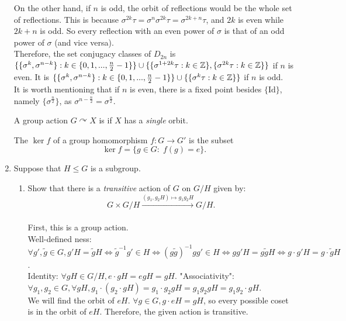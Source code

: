 \documentclass{amsart}
\begin{document}
\begin{enumerate}[itemsep=0.2in]
On the other hand, if $n$ is odd, the orbit of reflections would be the whole set of reflections. This is because $\sigma^{2k}\tau=\sigma^n\sigma^{2k}\tau=\sigma^{2k+n}\tau$, and $2k$ is even while $2k+n$ is odd. So every reflection with an even power of $\sigma$ is that of an odd power of $\sigma$ (and vice versa). \\

Therefore, the set conjugacy classes of $D_{2n}$ is $\{\{\sigma^k,\sigma^{n-k}\}:k\in\{0,1,...,\frac{n}{2}-1\}\}\cup\{\{\sigma^{1+2k}\tau:k\in\mathbb{Z}\},\{\sigma^{2k}\tau:k\in\mathbb{Z}\}\}$ if $n$ is even. 
It is $\{\{\sigma^k,\sigma^{n-k}\}:k\in\{0,1,...,\frac{n}{2}-1\}\}\cup\{\{\sigma^k\tau:k\in\mathbb{Z}\}\}$ if $n$ is odd.\\

It is worth mentioning that if $n$ is even, there is a fixed point besides $\{\mathrm{Id}\}$, namely $\{\sigma^{\frac{n}{2}}\}$, as $\sigma^{n-\frac{n}{2}}=\sigma^{\frac{n}{2}}$.

\vspace{0.2in}
A group action $G\curvearrowright X$ is  if $X$ has a \emph{single} orbit.


\vspace{0.2in}
The  $\ker f$ of a group homomorphism $f:G\to G'$ is the subset
\[
\ker f = \{g\in G:\; f(g) = e\}.
\]


\item Suppose that $H\leq G$ is a subgroup. 
\begin{enumerate}
	\item Show that there is a \emph{transitive} action of $G$ on $G/H$ given by:
\[
G\times G/H \xrightarrow{(g_1,g_2H)\mapsto g_1g_2H}G/H.
\]\\

First, this is a group action.\\

Well-defined ness:  $\forall g',\tilde{g}\in G,g'H=\tilde{g}H\iff\tilde{g}^{-1}g'\in H\iff(g\tilde{g})^{-1}gg'\in H\iff gg'H=g\tilde{g}H\iff g\cdot g'H=g\cdot \tilde{g}H$.\\

Identity: $\forall gH\in G/H,e\cdot gH=egH=gH$.
"Associativity": $\forall g_1,g_2\in G,\forall gH,g_1\cdot (g_2\cdot gH)=g_1\cdot g_2gH=g_1g_2gH=g_1g_2\cdot gH$.\\

We will find the orbit of $eH$. $\forall g\in G,g\cdot eH=gH$, so every possible coset is in the orbit of $eH$. Therefore, the given action is transitive.\\



\end{enumerate}
\end{enumerate}
\end{document}
